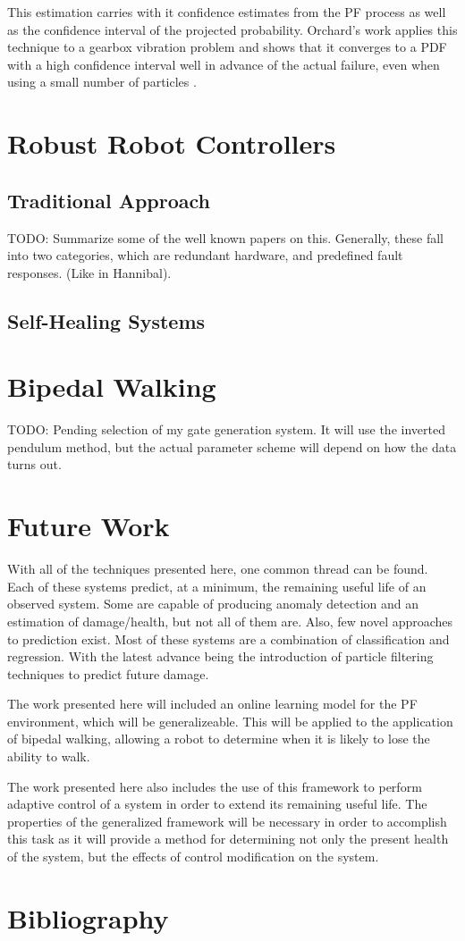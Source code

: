\documentclass[12pt]{article}
\begin{document}
This estimation carries with it confidence estimates from the PF
process as well as the confidence interval of the projected
probability.  Orchard's work applies this technique to a gearbox 
vibration problem and shows that it converges to a PDF with a high
confidence interval well in advance of the actual failure, even when
using a small number of particles \cite{4711433}.  

\section{Robust Robot Controllers}
\subsection{Traditional Approach}
TODO: Summarize some of the well known papers on this.  Generally,
these fall into two categories, which are redundant hardware, and
predefined fault responses.  (Like in Hannibal).

\subsection{Self-Healing Systems}


\section{Bipedal Walking}
TODO: Pending selection of my gate generation system.  It will use the
inverted pendulum method, but the actual parameter scheme will depend
on how the data turns out.

\section{Future Work}
With all of the techniques presented here, one common thread can be
found.  Each of these systems predict, at a minimum, the remaining
useful life of an observed system.  Some are capable of producing
anomaly detection and an estimation of damage/health, but not all of
them are.  Also, few novel approaches to prediction exist.  Most of
these systems are a combination of classification and regression.
With the latest advance being the introduction of particle filtering
techniques to predict future damage.

The work presented here will included an online learning model for the
PF environment, which will be generalizeable.  This will be applied to
the application of bipedal walking, allowing a robot to determine when
it is likely to lose the ability to walk.

The work presented here also includes the use of this framework to
perform adaptive control of a system in order to extend its remaining
useful life.  The properties of the generalized framework will be
necessary in order to accomplish this task as it will provide a method
for determining not only the present health of the system, but the
effects of control modification on the system.  


\section{Bibliography}


\end{document}

